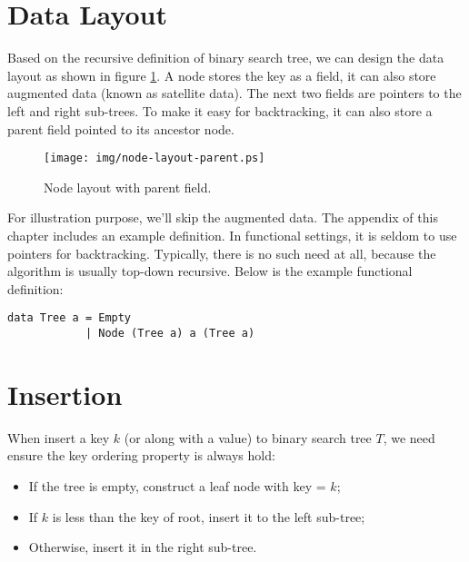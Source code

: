 \documentclass[b5paper]{article}
\begin{document}
\section{Data Layout}

Based on the recursive definition of binary search tree, we can design the data layout as shown in figure \ref{fig:node-layout-parent}. A node stores the key as a field, it can also store augmented data (known as satellite data). The next two fields are pointers to the left and right sub-trees. To make it easy for backtracking, it can also store a parent field pointed to its ancestor node.

\begin{figure}[htbp]
       \begin{center}
        \texttt{[image: img/node-layout-parent.ps]}
        \caption{Node layout with parent field.} \label{fig:node-layout-parent}
       \end{center}
\end{figure}

For illustration purpose, we'll skip the augmented data. The appendix of this chapter includes an example definition. In functional settings, it is seldom to use pointers for backtracking. Typically, there is no such need at all, because the algorithm is usually top-down recursive. Below is the example functional definition:

\lstset{language=Haskell}
\begin{lstlisting}
data Tree a = Empty
            | Node (Tree a) a (Tree a)
\end{lstlisting}

\section{Insertion}

When insert a key $k$ (or along with a value) to binary search tree $T$, we need ensure the key ordering property is always hold:

\begin{itemize}
\item If the tree is empty, construct a leaf node with key = $k$;
\item If $k$ is less than the key of root, insert it to the left sub-tree;
\item Otherwise, insert it in the right sub-tree.
\end{itemize}
\end{document}
